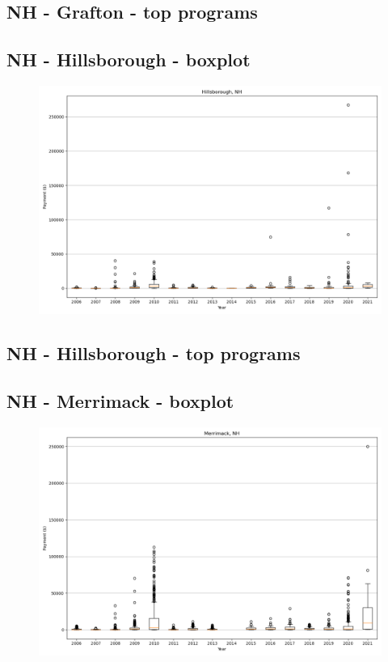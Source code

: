 \subsection*{NH - Grafton - top programs}

\newpage
\subsection*{NH - Hillsborough - boxplot}
\begin{figure}[h]
\centering
\includegraphics[width=7in]{../output/boxplots/counties/Hillsborough-NH_boxplot.png}
\end{figure}


\subsection*{NH - Hillsborough - top programs}

\newpage
\subsection*{NH - Merrimack - boxplot}
\begin{figure}[h]
\centering
\includegraphics[width=7in]{../output/boxplots/counties/Merrimack-NH_boxplot.png}
\end{figure}


